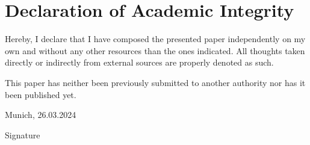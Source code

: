 \documentclass[12pt]{article}
\begin{document}
\section*{Declaration of Academic Integrity}

Hereby, I declare that I have composed the presented paper independently on my own and without any other resources than the ones indicated. All thoughts taken directly or indirectly from external sources are properly denoted as such. \par

This paper has neither been previously submitted to another authority nor has it been published yet. \vspace{20pt}

Munich, 26.03.2024 \vspace{30pt}

Signature
\end{document}
